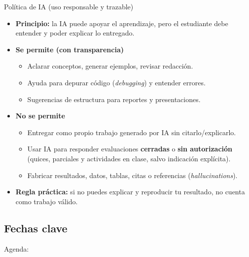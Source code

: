 \documentclass[10pt, xcolor=dvipsnames]{beamer}
\begin{document}
\begin{frame}{Política de IA (uso responsable y trazable)}
\small
\begin{itemize}
  \item \textbf{Principio:} la IA puede apoyar el aprendizaje, pero el estudiante debe entender y poder explicar lo entregado. \vspace{0.15cm}

  \item \textbf{Se permite (con transparencia)}
  \begin{itemize}
    \item Aclarar conceptos, generar ejemplos, revisar redacción.
    \item Ayuda para depurar código (\textit{debugging}) y entender errores.
    \item Sugerencias de estructura para reportes y presentaciones.
  \end{itemize} \vspace{0.15cm}

  \item \textbf{No se permite}
  \begin{itemize}
    \item Entregar como propio trabajo generado por IA sin citarlo/explicarlo.
    \item Usar IA para responder evaluaciones \textbf{cerradas} o \textbf{sin autorización} (quices, parciales y actividades en clase, salvo indicación explícita).
    \item Fabricar resultados, datos, tablas, citas o referencias (\textit{hallucinations}).
  \end{itemize} \vspace{0.15cm}

  \item \textbf{Regla práctica:} si no puedes explicar y reproducir tu resultado, no cuenta como trabajo válido.
\end{itemize}
\end{frame}


\subsection{Fechas clave}
\begin{frame}[noframenumbering]{Agenda:}
\end{frame}
\end{document}
